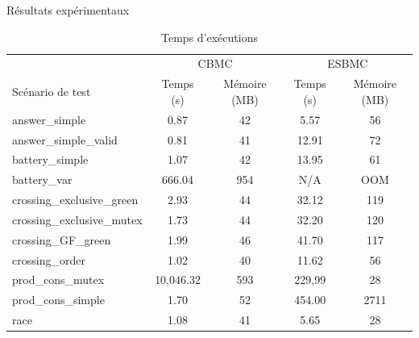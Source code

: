 \documentclass{beamer}
\begin{document}
\begin{frame}{Résultats expérimentaux}
\begin{table}[tbp]
\centering
\scriptsize
\label{tbl:performances}
\caption{Temps d'exécutions}
\begin{tabular}{|l|c|c|c|c|}
\hline
                           & \multicolumn{2}{c|}{CBMC} & \multicolumn{2}{c|}{ESBMC}\\
Scénario de test           & Temps (s) & Mémoire (MB) & Temps (s) & Mémoire (MB) \\
\hline
answer\_simple             & 0.87      & 42           & 5.57      & 56           \\
\rowcolor{light-gray}
answer\_simple\_valid      & 0.81      & 41           & 12.91     & 72           \\
battery\_simple            & 1.07      & 42           & 13.95     & 61           \\
\rowcolor{light-gray}
battery\_var               & 666.04    & 954          & N/A       & OOM          \\
crossing\_exclusive\_green & 2.93      & 44           & 32.12     & 119          \\
crossing\_exclusive\_mutex & 1.73      & 44           & 32.20     & 120          \\
crossing\_GF\_green        & 1.99      & 46           & 41.70     & 117          \\
crossing\_order            & 1.02      & 40           & 11.62     & 56           \\
prod\_cons\_mutex          & 10,046.32 & 593          & 229,99    & 28           \\
\rowcolor{light-gray}
prod\_cons\_simple         & 1.70      & 52           & 454.00    & 2711         \\
race                       & 1.08      & 41           & 5.65      & 28           \\
\hline
\end{tabular}
\end{table}
\end{frame}
\end{document}
